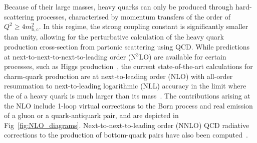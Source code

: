 Because of their large masses, heavy quarks can only be produced through hard-scattering processes, characterised by momentum transfers of the order of $Q^2 \geq 4m^2_\mathrm{b,c}$. In this regime, the strong coupling constant is significantly smaller than unity, allowing for the perturbative calculation of the heavy quark production cross-section from partonic scattering using QCD. While predictions at next-to-next-to-next-to-leading order (N$^3$LO) are available for certain processes, such as Higgs production~\cite{Anastasiou:2015vya, Anastasiou:2016cez}, the current state-of-the-art calculations for charm-quark production are at next-to-leading order (NLO) with all-order resummation to next-to-leading logarithmic (NLL) accuracy in the limit where the \pt of a heavy quark is much larger than its mass~\cite{Cacciari:1998it}. The contributions arising at the NLO include 1-loop virtual corrections to the Born process and real emission of a gluon or a quark-antiquark pair, and are depicted in Fig~\ref{fig:NLO_diagrams}. Next-to-next-to-leading order (NNLO) QCD radiative corrections to the production of bottom-quark pairs have also been computed~\cite{Catani:2020kkl}.


